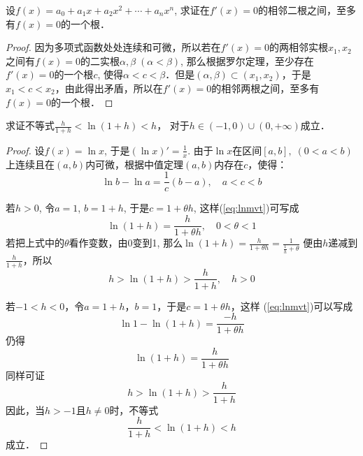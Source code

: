 \begin{example}
    设$f(x)=a_0+a_1x+a_2x^2+\cdots+a_nx^n$, 求证在$f'(x)=0$的相邻二根之间，至多有$f(x)=0$的一个根．   
\end{example}

\begin{proof}
因为多项式函数处处连续和可微，所以若在$f'(x)=0$的两相邻实根$x_1,x_2$之间有$f(x)=0$的二实根$\alpha,\beta\; (\alpha<\beta)$, 那么根据罗尔定理，至少存在$f'(x)=0$的一个根$c$, 使得$\alpha<c<\beta$．但是$(\alpha,\beta)\subset (x_1,x_2)$，于是$x_1<c<x_2$，由此得出矛盾，所以在$f'(x)=0$的相邻两根之间，至多有$f(x)=0$的一个根．
\end{proof}

\begin{example}
    求证不等式$\frac{h}{1+h}<\ln(1+h)<h$，
    对于$h\in (-1, 0)\cup (0,+\infty)$成立．
\end{example}


\begin{proof}
    设$f(x)=\ln x$, 于是$(\ln x)'=\frac{1}{x}$. 由于$\ln x$在区间$[a,b],\; (0<a<b)$上连续且在$(a,b)$内可微，根据中值定理$(a,b)$内存在$c$，使得：
\begin{equation}
    \ln b-\ln a=\frac{1}{c}(b-a),\quad a<c<b \label{eq:lnmvt}
\end{equation}

若$h>0$, 令$a=1$, $b=1+h$, 于是$c=1+\theta h$, 这样(\ref{eq:lnmvt})可写成
\[\ln (1+h) =\frac{h}{1+\theta h},\quad 0<\theta<1\]
若把上式中的$\theta$看作变数，由0变到1, 那么$\ln(1+h)=\frac{h}{1+\theta h}=\frac{1}{\frac{1}{h}+\theta}$
便由$h$递减到$\frac{h}{1+h}$，所以
\[h>\ln(1+h)>\frac{h}{1+h},\quad h>0\]

若$-1<h<0$，令$a=1+h$，$b=1$，于是$c=1+\theta h$，这样
(\ref{eq:lnmvt})可以写成
\[\ln1-\ln (1+h) =\frac{-h}{1+\theta h}\]
仍得
\[\ln (1+h) =\frac{h}{1+\theta h}\]
同样可证
\[h> \ln (1+h) >\frac{h}{1+h}\]
因此，当$h>-1$且$h\ne 0$时，不等式
\[\frac{h}{1+h}<\ln(1+h)<h\]
成立．
\end{proof}




